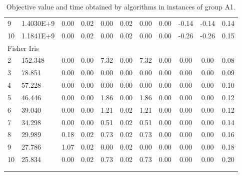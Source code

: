 {\begin{longtable}{@{}llccccccccc@{}}
9  & 1.4030E+9  & 0.00         & 0.02         & 0.00        & 0.02       & 0.00        & 0.00      & -0.14     & -0.14     & 0.14  \\
10 & 1.1841E+9  & 0.00         & 0.02         & 0.00        & 0.02       & 0.00        & 0.00      & -0.26     & -0.26     & 0.15  \\
\multicolumn{11}{l}{Fisher Iris}                                                                                                   \\
2  & 152.348    & 0.00         & 0.00         & 7.32        & 0.00       & 7.32        & 0.00      & 0.00      & 0.00      & 0.08  \\
3  & 78.851     & 0.00         & 0.00         & 0.00        & 0.00       & 0.00        & 0.00      & 0.00      & 0.00      & 0.09  \\
4  & 57.228     & 0.00         & 0.00         & 0.00        & 0.00       & 0.00        & 0.00      & 0.00      & 0.00      & 0.10  \\
5  & 46.446     & 0.00         & 0.00         & 1.86        & 0.00       & 1.86        & 0.00      & 0.00      & 0.00      & 0.12  \\
6  & 39.040     & 0.00         & 0.00         & 1.21        & 0.02       & 1.21        & 0.00      & 0.00      & 0.00      & 0.12  \\
7  & 34.298     & 0.00         & 0.00         & 0.51        & 0.02       & 0.51        & 0.00      & 0.00      & 0.00      & 0.14  \\
8  & 29.989     & 0.18         & 0.02         & 0.73        & 0.02       & 0.73        & 0.00      & 0.00      & 0.00      & 0.16  \\
9  & 27.786     & 1.07         & 0.02         & 0.00        & 0.02       & 0.00        & 0.00      & 0.00      & 0.00      & 0.18  \\
10 & 25.834     & 0.00         & 0.02         & 0.73        & 0.02       & 0.73        & 0.00      & 0.00      & 0.00      & 0.20  \\ \bottomrule
\caption{Objective value and time obtained by algorithms in instances of group A1.}\\
\label{results-all-A1}\\
\end{longtable}}
